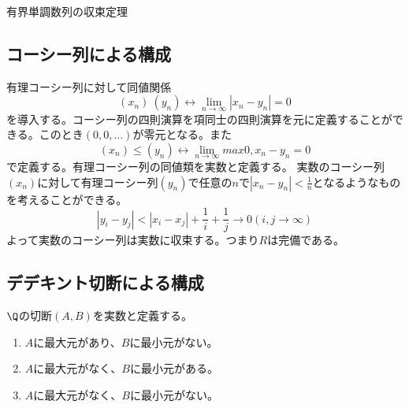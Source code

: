 \begin{description}\item[有界単調数列の収束定理]
\end{description}

	\subsection{コーシー列による構成}
	有理コーシー列に対して同値関係
		\[(x_n) ~ (y_n) \leftrightarrow \lim_{n \to \infty} |x_n - y_n| = 0\]
	を導入する。コーシー列の四則演算を項同士の四則演算を元に定義することができる。このとき$(0, 0, \ldots)$が零元となる。また
		\[(x_n) \leq (y_n) \leftrightarrow \lim_{n \to \infty} max{0, x_n - y_n} = 0\]
	で定義する。有理コーシー列の同値類を実数と定義する。
	実数のコーシー列$(x_n)$に対して有理コーシー列$(y_n)$で任意の$n$で$|x_n - y_n| < \frac{1}{n}$となるようなものを考えることができる。
		\[|y_i - y_j| < |x_i - x_j| + \frac{1}{i} + \frac{1}{j} \to 0 (i, j \to \infty)\]
	よって実数のコーシー列は実数に収束する。つまり$R$は完備である。

	\subsection{デデキント切断による構成}
	$\Q$の切断$(A, B)$を実数と定義する。
	\begin{enumerate}
		\item $A$に最大元があり、$B$に最小元がない。
		\item $A$に最大元がなく、$B$に最小元がある。
		\item $A$に最大元がなく、$B$に最小元がない。
	\end{enumerate}
	\begin{enumerate}
	\end{enumerate}